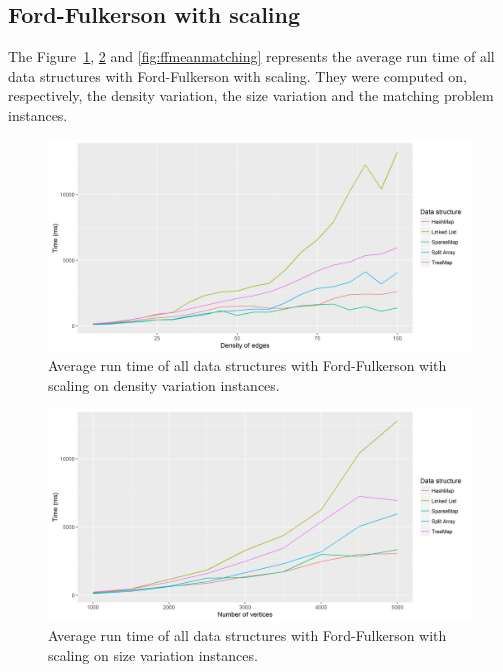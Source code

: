 \subsection{Ford-Fulkerson with scaling}
The Figure~\ref{fig:ffmeandensity}, \ref{fig:ffmeansize} and \ref{fig:ffmeanmatching} represents the average run time of all data structures with Ford-Fulkerson with scaling. They were computed on, respectively, the density variation, the size variation and the matching problem instances.
\begin{figure}[H]
\begin{center}
\includegraphics[scale=0.5]{images/results/ffmeandensity.png}
\caption{Average run time of all data structures with Ford-Fulkerson with scaling on density variation instances.}
\label{fig:ffmeandensity}
\end{center}
\end{figure}
\begin{figure}[H]
\begin{center}
\includegraphics[scale=0.5]{images/results/ffmeansize.png}
\caption{Average run time of all data structures with Ford-Fulkerson with scaling on size variation instances.}
\label{fig:ffmeansize}
\end{center}
\end{figure}
